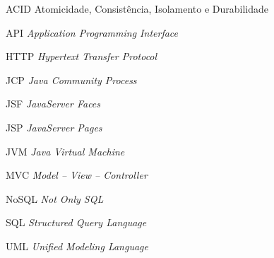 
\begin{SingleSpace}

\begin{siglas}
\item[ACID]  Atomicidade, Consistência, Isolamento e Durabilidade
\item[API]   \textit{Application Programming Interface}
\item[HTTP]  \textit{Hypertext Transfer Protocol}
\item[JCP]   \textit{Java Community Process}
\item[JSF]   \textit{JavaServer Faces}
\item[JSP]   \textit{JavaServer Pages}
\item[JVM]   \textit{Java Virtual Machine}
\item[MVC]   \textit{Model -- View -- Controller}
\item[NoSQL] \textit{Not Only SQL}
\item[SQL]   \textit{Structured Query Language}
\item[UML]   \textit{Unified Modeling Language}

\end{siglas}

\end{SingleSpace}
